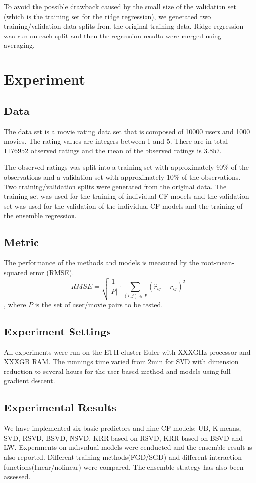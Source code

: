 \documentclass[10pt,conference,compsocconf]{IEEEtran}
\begin{document}
To avoid the possible drawback caused by the small size of the validation set (which is the training set for the ridge regression), we generated two training/validation data splits from the original training data. Ridge regression was run on each split and then the regression results were merged using averaging.

\section{Experiment}
\subsection{Data}
 The data set is a movie rating data set that is composed of 10000 users and 1000 movies. The rating values are integers between 1 and 5. There are in total 1176952 observed ratings and the mean of the observed ratings is $3.857$.

 The observed ratings was split into a training set with approximately 90\% of the observations and a validation set with approximately 10\% of the observations. Two training/validation splits were generated from the original data. The training set was used for the training of individual CF models and the validation set was used for the validation of the individual CF models and the training of the ensemble regression.

\subsection{Metric}
The performance of the methods and models is measured by the root-mean-squared error (RMSE).
\[RMSE = \sqrt {\frac{1}{{\left| P \right|}} \cdot \sum\limits_{(i,j) \in P} {{{({{\hat r}_{ij}} - {r_{ij}})}^2}} } \]
, where $P$ is the set of user/movie pairs to be tested.

\subsection{Experiment Settings}
All experiments were run on the ETH cluster Euler with XXXGHz processor and XXXGB RAM. The runnings time varied from 2min for SVD with dimension reduction to several hours for the user-based method and models using full gradient descent.

\subsection{Experimental Results}
We have implemented six basic predictors and nine CF models: UB, K-means, SVD, RSVD, BSVD, NSVD, KRR based on RSVD, KRR based on BSVD and LW. Experiments on individual models were conducted and the ensemble result is also reported. Different training methods(FGD/SGD) and different interaction
functions(linear/nolinear) were compared. The ensemble strategy has also been assessed.
\end{document}

